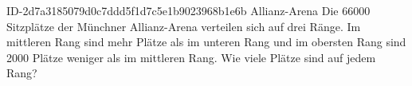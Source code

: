 \begin{exercise}
      {ID-2d7a3185079d0c7ddd5f1d7c5e1b9023968b1e6b}
      {Allianz-Arena}
  \ifproblem\problem
    Die \num{66000} Sitzplätze der Münchner Allianz-Arena verteilen sich auf drei Ränge.
    Im mittleren Rang sind  mehr Plätze als im unteren Rang und im obersten
    Rang sind \num{2000} Plätze weniger als im mittleren Rang. Wie viele Plätze sind auf
    jedem Rang?
  \fi
\end{exercise}
